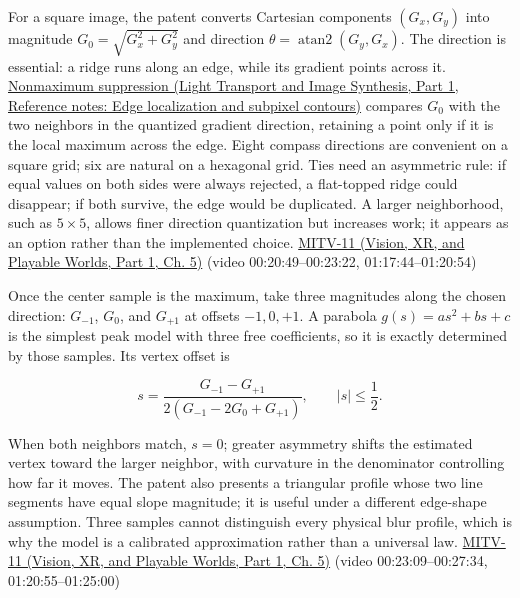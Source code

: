 For a square image, the patent converts Cartesian components \((G_x,G_y)\) into magnitude \(G_0=\sqrt{G_x^2+G_y^2}\) and direction \(\theta=\operatorname{atan2}(G_y,G_x)\). The direction is essential: a ridge runs along an edge, while its gradient points across it. \href{../04-Light-Transport-and-Image-Synthesis-P01/main.pdf\#nameddest=appendix-36022286b03e}{Nonmaximum suppression (Light Transport and Image Synthesis, Part 1, Reference notes: Edge localization and subpixel contours)} compares \(G_0\) with the two neighbors in the quantized gradient direction, retaining a point only if it is the local maximum across the edge. Eight compass directions are convenient on a square grid; six are natural on a hexagonal grid. Ties need an asymmetric rule: if equal values on both sides were always rejected, a flat-topped ridge could disappear; if both survive, the edge would be duplicated. A larger neighborhood, such as \(5\times5\), allows finer direction quantization but increases work; it appears as an option rather than the implemented choice. \href{../07-Vision-XR-and-Playable-Worlds-P01/main.pdf\#nameddest=04-visual-computing-ii-ch036-mitv-11---edge-detection-subpixel-position-cordic-line-detection-us-6408109}{MITV-11 (Vision, XR, and Playable Worlds, Part 1, Ch. 5)} (video 00:20:49--00:23:22, 01:17:44--01:20:54)

Once the center sample is the maximum, take three magnitudes along the chosen direction: \(G_{-1}\), \(G_0\), and \(G_{+1}\) at offsets \(-1,0,+1\). A parabola \(g(s)=as^2+bs+c\) is the simplest peak model with three free coefficients, so it is exactly determined by those samples. Its vertex offset is

\[
s=\frac{G_{-1}-G_{+1}}{2(G_{-1}-2G_0+G_{+1})},\qquad |s|\le\frac12.
\]

When both neighbors match, \(s=0\); greater asymmetry shifts the estimated vertex toward the larger neighbor, with curvature in the denominator controlling how far it moves. The patent also presents a triangular profile whose two line segments have equal slope magnitude; it is useful under a different edge-shape assumption. Three samples cannot distinguish every physical blur profile, which is why the model is a calibrated approximation rather than a universal law. \href{../07-Vision-XR-and-Playable-Worlds-P01/main.pdf\#nameddest=04-visual-computing-ii-ch036-mitv-11---edge-detection-subpixel-position-cordic-line-detection-us-6408109}{MITV-11 (Vision, XR, and Playable Worlds, Part 1, Ch. 5)} (video 00:23:09--00:27:34, 01:20:55--01:25:00)

